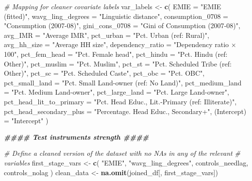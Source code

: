 \documentclass[
]{article}
\newenvironment{Shaded}{\begin{snugshade}}{\end{snugshade}}
\newcommand{\AttributeTok}[1]{\textcolor[rgb]{0.13,0.29,0.53}{#1}}
\newcommand{\CommentTok}[1]{\textcolor[rgb]{0.56,0.35,0.01}{\textit{#1}}}
\newcommand{\DocumentationTok}[1]{\textcolor[rgb]{0.56,0.35,0.01}{\textbf{\textit{#1}}}}
\newcommand{\FunctionTok}[1]{\textcolor[rgb]{0.13,0.29,0.53}{\textbf{#1}}}
\newcommand{\NormalTok}[1]{#1}
\newcommand{\OtherTok}[1]{\textcolor[rgb]{0.56,0.35,0.01}{#1}}
\newcommand{\StringTok}[1]{\textcolor[rgb]{0.31,0.60,0.02}{#1}}
\begin{document}
\begin{Shaded}
\begin{Highlighting}[]
\CommentTok{\# Mapping for cleaner covariate labels}
\NormalTok{var\_labels }\OtherTok{\textless{}{-}} \FunctionTok{c}\NormalTok{(}
    \AttributeTok{EMIE =} \StringTok{"EMIE (fitted)"}\NormalTok{,}
    \AttributeTok{wavg\_ling\_degrees =} \StringTok{"Linguistic distance"}\NormalTok{,}
    \AttributeTok{consumption\_0708 =} \StringTok{"Consumption (2007{-}08)"}\NormalTok{,}
    \AttributeTok{gini\_cons\_0708 =} \StringTok{"Gini of Consumption (2007{-}08)"}\NormalTok{,}
    \AttributeTok{avg\_IMR =} \StringTok{"Average IMR"}\NormalTok{,}
    \AttributeTok{pct\_urban =} \StringTok{"Pct. Urban (ref: Rural)"}\NormalTok{,}
    \AttributeTok{avg\_hh\_size =} \StringTok{"Average HH size"}\NormalTok{,}
    \AttributeTok{dependency\_ratio =} \StringTok{"Dependency ratio × 100"}\NormalTok{,}
    \AttributeTok{pct\_fem\_head =} \StringTok{"Pct. Female head"}\NormalTok{,}
    \AttributeTok{pct\_hindu =} \StringTok{"Pct. Hindu  (ref: Other)"}\NormalTok{,}
    \AttributeTok{pct\_muslim =} \StringTok{"Pct. Muslim"}\NormalTok{,}
    \AttributeTok{pct\_st =} \StringTok{"Pct. Scheduled Tribe (ref: Other)"}\NormalTok{,}
    \AttributeTok{pct\_sc =} \StringTok{"Pct. Scheduled Caste"}\NormalTok{,}
    \AttributeTok{pct\_obc =} \StringTok{"Pct. OBC"}\NormalTok{,}
    \AttributeTok{pct\_small\_land =} \StringTok{"Pct. Small Land{-}owner (ref: No Land)"}\NormalTok{,}
    \AttributeTok{pct\_medium\_land =} \StringTok{"Pct. Medium Land{-}owner"}\NormalTok{,}
    \AttributeTok{pct\_large\_land =} \StringTok{"Pct. Large Land{-}owner"}\NormalTok{,}
    \AttributeTok{pct\_head\_lit\_to\_primary =} \StringTok{"Pct. Head Educ., Lit.{-}Primary (ref: Illiterate)"}\NormalTok{,}
    \AttributeTok{pct\_head\_secondary\_plus =} \StringTok{"Percentage. Head Educ., Secondary+"}\NormalTok{,}
    \StringTok{\textasciigrave{}}\AttributeTok{(Intercept)}\StringTok{\textasciigrave{}} \OtherTok{=} \StringTok{"Intercept"}
\NormalTok{)}


\DocumentationTok{\#\#\#\# Test instrument\textquotesingle{}s strength \#\#\#\#}

\CommentTok{\# Define a cleaned version of the dataset with no NAs in any of the relevant}
\CommentTok{\# variables}
\NormalTok{first\_stage\_vars }\OtherTok{\textless{}{-}} \FunctionTok{c}\NormalTok{(}
    \StringTok{"EMIE"}\NormalTok{, }\StringTok{"wavg\_ling\_degrees"}\NormalTok{, controls\_needlag,}
\NormalTok{    controls\_nolag}
\NormalTok{)}
\NormalTok{clean\_data }\OtherTok{\textless{}{-}} \FunctionTok{na.omit}\NormalTok{(joined\_df[, first\_stage\_vars])}


\end{Highlighting}
\end{Shaded}
\end{document}
